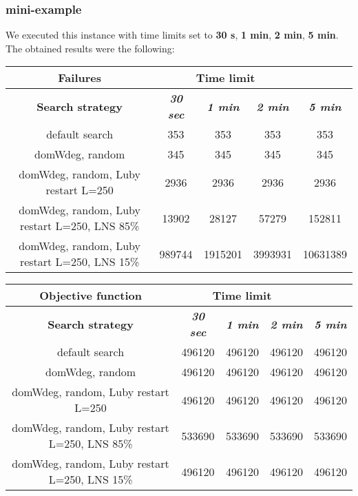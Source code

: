 \subsubsection{mini-example}
We executed this instance with time limits set to \textbf{30 s}, \textbf{1 min}, \textbf{2 min}, \textbf{5 min}.\\
The obtained results were the following:
{
\renewcommand{\arraystretch}{2}
\begin{longtable}[h]{| c | c | c | c | c |}
    \hline
    \textbf{Failures} & \multicolumn{3}{c}{Time limit} & \\
    \hline
    \textbf{Search strategy} & \textbf{\textit{30 sec}} & \textbf{\textit{1 min}} & \textbf{\textit{2 min}} & \textbf{\textit{5 min}} \\
    \hline
    \endhead
    default search                                &    353 &     353 &     353 &      353 \\
    \hline
    domWdeg, random                               &    345 &     345 &     345 &      345 \\
    \hline
    domWdeg, random, Luby restart L=250           &   2936 &    2936 &    2936 &     2936 \\
    \hline
    domWdeg, random, Luby restart L=250, LNS 85\% &  13902 &   28127 &   57279 &   152811 \\
    \hline
    domWdeg, random, Luby restart L=250, LNS 15\% & 989744 & 1915201 & 3993931 & 10631389 \\
    \hline
\end{longtable}
}

{
\renewcommand{\arraystretch}{2}
\begin{longtable}[h]{| c | c | c | c | c |}
    \hline
    \textbf{Objective function} & \multicolumn{3}{c}{Time limit} & \\
    \hline
    \textbf{Search strategy} & \textbf{\textit{30 sec}} & \textbf{\textit{1 min}} & \textbf{\textit{2 min}} & \textbf{\textit{5 min}} \\
    \hline
    \endhead
    default search                                & 496120 & 496120 & 496120 & 496120 \\
    \hline
    domWdeg, random                               & 496120 & 496120 & 496120 & 496120 \\
    \hline
    domWdeg, random, Luby restart L=250           & 496120 & 496120 & 496120 & 496120 \\
    \hline
    domWdeg, random, Luby restart L=250, LNS 85\% & 533690 & 533690 & 533690 & 533690 \\
    \hline
    domWdeg, random, Luby restart L=250, LNS 15\% & 496120 & 496120 & 496120 & 496120 \\
    \hline
\end{longtable}
}
